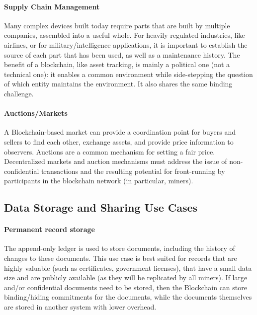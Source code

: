\paragraph{Supply Chain Management} %
Many complex devices built today require parts that are built by multiple companies, assembled into a useful whole. For heavily regulated industries, like airlines, or for military/intelligence applications, it is important to establish the source of each part that has been used, as well as a maintenance history. The benefit of a blockchain, like asset tracking, is mainly a political one (not a technical one): it enables a common environment while side-stepping the question of which entity maintains the environment. It also shares the same binding challenge.

\paragraph{Auctions/Markets}
A Blockchain-based market can provide a coordination point for buyers and sellers to find each other, exchange assets, and provide price information to observers. 
Auctions are a common mechanism for setting a fair price. 
Decentralized markets and auction mechanisms must address the issue of non-confidential transactions and the resulting potential for front-running by participants in the blockchain network (in particular, miners).

\subsection{Data Storage and Sharing Use Cases}

\paragraph{Permanent record storage}
The append-only ledger is used to store documents, including the history of changes to these documents.
This use case is best suited for records that are highly valuable (such as certificates, government licenses), that have a small data size and are publicly available (as they will be replicated by all miners).
If large and/or confidential documents need to be stored, then the Blockchain can store binding/hiding commitments for the documents, while the documents themselves are stored in another system with lower overhead.

